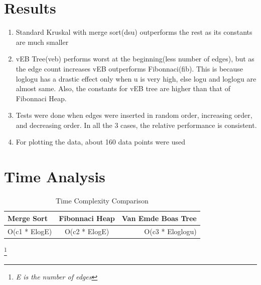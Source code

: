 \documentclass{article}
\begin{document}
\section{Results}
\begin{enumerate}
\item Standard Kruskal with merge sort(dsu) outperforms the rest as its constants are much smaller
\item vEB Tree(veb) performs worst at the beginning(less number of edges), but as the edge count increases vEB outperforms Fibonnaci(fib). This is because loglogu has a drastic effect only when u is very high, else logu and loglogu are almost same. Also, the constants for vEB tree are higher than that of Fibonnaci Heap.
\item Tests were done when edges were inserted in random order, increasing order, and decreasing order. In all the 3 cases, the relative performance is consistent.
\item For plotting the data, about 160 data points were used

\end{enumerate}


\section{Time Analysis}

\begin{table}[h!]
  \begin{center}
    \label{tab:table1}
    \begin{tabular}{l|c|r} %
      \textbf{Merge Sort} & \textbf{Fibonnaci Heap} & \textbf{Van Emde Boas Tree}\\
      \hline
      O(c1 * ElogE) & O(c2 * ElogE) & O(c3 * Eloglogu)\\
    \end{tabular}
    \caption{Time Complexity Comparison}
  \end{center}
  \footnote{\textit{E is the number of edges}}
\end{table}
\end{document}
